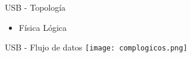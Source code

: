 \begin{frame}{USB - Topología}
	\centering
	\begin{itemize}
		\item {} {Física} \only<2> {Lógica}
	\end{itemize}
\end{frame}
\begin{frame}{USB - Flujo de datos}
	\centering
	\texttt{[image: complogicos.png]}
\end{frame}

%
